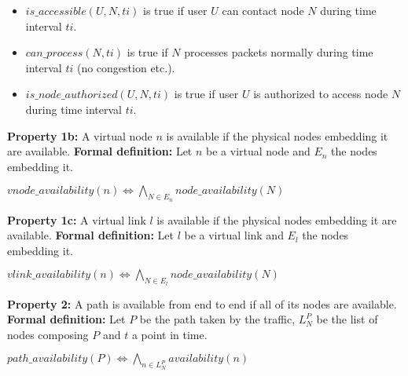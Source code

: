 \begin{itemize}
\item $is\_accessible(U,N,ti)$ is true if user $U$ can contact node $N$ during time interval $ti$.
\item $can\_process(N,ti)$ is true if $N$ processes packets normally during time interval $ti$ (\eg no congestion etc.).
\item $is\_node\_authorized(U,N,ti)$ is true if user $U$ is authorized to access node $N$ during time interval $ti$.
\end{itemize} 

\textbf{Property 1b:} A virtual node $n$ is available if the physical nodes embedding it are available.
\newline
\textbf{Formal definition:} Let $n$ be a virtual node and $E_n$ the nodes embedding it.

\begin{myformula}
$vnode\_availability(n) \Leftrightarrow \bigwedge\limits_{N \in E_n} node\_availability(N)$
\end{myformula}

\textbf{Property 1c:} A virtual link $l$ is available if the physical nodes embedding it are available.
\newline
\textbf{Formal definition:} Let $l$ be a virtual link and $E_l$ the nodes embedding it.

\begin{myformula}
$vlink\_availability(n) \Leftrightarrow \bigwedge\limits_{N \in E_l} node\_availability(N)$
\end{myformula}

\textbf{Property 2:} A path is available from end to end if all of its nodes are available.
\newline \textbf{Formal definition:} Let $P$ be the path taken by the traffic, $L^P_N$ be the list of nodes composing $P$ and $t$ a point in time. 

\begin{myformula}
$path\_availability(P)\Leftrightarrow\bigwedge\limits_{n \in L^P_N}availability(n)$
\end{myformula}



